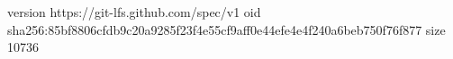 version https://git-lfs.github.com/spec/v1
oid sha256:85bf8806cfdb9c20a9285f23f4e55cf9aff0e44efe4e4f240a6beb750f76f877
size 10736
